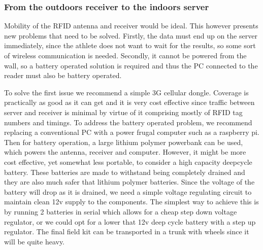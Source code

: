 \documentclass{article}
\begin{document}
\subsubsection{From the outdoors receiver to the indoors server}
Mobility of the RFID antenna and receiver would be ideal. This however presents new problems that need to be solved. Firstly, the data must end up on the server immediately, since the athlete does not want to wait for the results, so some sort of wireless communication is needed. Secondly, it cannot be powered from the wall, so a battery operated solution is required and thus the PC connected to the reader must also be battery operated.
\par
\bigskip
\nointent
To solve the first issue we recommend a simple 3G cellular dongle. Coverage is practically as good as it can get and it is very cost effective since traffic between server and receiver is minimal by virtue of it comprising mostly of RFID tag numbers and timings. To address the battery operated problem, we recommend replacing a conventional PC with a power frugal computer such as a raspberry pi. Then for battery operation, a large lithium polymer powerbank can be used, which powers the antenna, receiver and computer. However, it might be more cost effective, yet somewhat less portable, to consider a high capacity deepcycle battery. These batteries are made to withstand being completely drained and they are also much safer that lithium polymer batteries. Since the voltage of the battery will drop as it is drained, we need a simple voltage regulating circuit to maintain clean 12v supply to the components. The simplest way to achieve this is by running 2 batteries in serial which allows for a cheap step down voltage regulator, or we could opt for a lower that 12v deep cycle battery with a step up regulator. The final field kit can be transported in a trunk with wheels since it will be quite heavy.  
 
\end{document}
